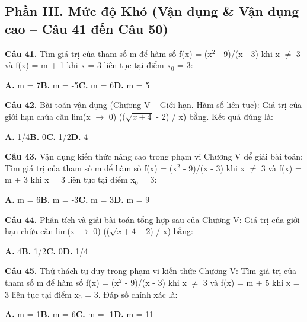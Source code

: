 \documentclass[11pt,a4paper]{article}
\begin{document}
\subsection*{\color{accent} Phần III. Mức độ Khó (Vận dụng \& Vận dụng cao -- Câu 41 đến Câu 50)}
\textbf{\color{primary} Câu 41.} Tìm giá trị của tham số m để hàm số f(x) = (x$^2$ - 9)/(x - 3) khi x $\ne$ 3 và f(x) = m + 1 khi x = 3 liên tục tại điểm x$_0$ = 3:\par
\hspace*{1.5em}\textbf{A.} m = 7\quad\quad \textbf{B.} m = -5\quad\quad \textbf{C.} m = 6\quad\quad \textbf{D.} m = 5\par\vspace{2pt}
\textbf{\color{primary} Câu 42.} Bài toán vận dụng (Chương V – Giới hạn. Hàm số liên tục): Giá trị của giới hạn chứa căn lim(x $\to$ 0) (($\sqrt{x + 4}$ - 2) / x) bằng. Kết quả đúng là:\par
\hspace*{1.5em}\textbf{A.} 1/4\quad\quad \textbf{B.} 0\quad\quad \textbf{C.} 1/2\quad\quad \textbf{D.} 4\par\vspace{2pt}
\textbf{\color{primary} Câu 43.} Vận dụng kiến thức nâng cao trong phạm vi Chương V để giải bài toán: Tìm giá trị của tham số m để hàm số f(x) = (x$^2$ - 9)/(x - 3) khi x $\ne$ 3 và f(x) = m + 3 khi x = 3 liên tục tại điểm x$_0$ = 3:\par
\hspace*{1.5em}\textbf{A.} m = 6\quad\quad \textbf{B.} m = -3\quad\quad \textbf{C.} m = 3\quad\quad \textbf{D.} m = 9\par\vspace{2pt}
\textbf{\color{primary} Câu 44.} Phân tích và giải bài toán tổng hợp sau của Chương V: Giá trị của giới hạn chứa căn lim(x $\to$ 0) (($\sqrt{x + 4}$ - 2) / x) bằng:\par
\hspace*{1.5em}\textbf{A.} 4\quad\quad \textbf{B.} 1/2\quad\quad \textbf{C.} 0\quad\quad \textbf{D.} 1/4\par\vspace{2pt}
\textbf{\color{primary} Câu 45.} Thử thách tư duy trong phạm vi kiến thức Chương V: Tìm giá trị của tham số m để hàm số f(x) = (x$^2$ - 9)/(x - 3) khi x $\ne$ 3 và f(x) = m + 5 khi x = 3 liên tục tại điểm x$_0$ = 3. Đáp số chính xác là:\par
\hspace*{1.5em}\textbf{A.} m = 1\quad\quad \textbf{B.} m = 6\quad\quad \textbf{C.} m = -1\quad\quad \textbf{D.} m = 11\par\vspace{2pt}
\end{document}
